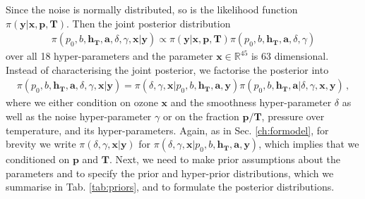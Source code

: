 Since the noise is normally distributed, so is the likelihood function $\pi(\bm{y} | \bm{x}, \bm{p}, \bm{T})$.
Then the joint posterior distribution
\begin{align}
	\pi(p_0,b,\bm{h_T},\bm{a},\delta, \gamma, \bm{x}| \bm{y}) \propto \pi(\bm{y} | \bm{x}, \bm{p}, \bm{T}) \pi(p_0,b,\bm{h_T},\bm{a},\delta, \gamma) 
\end{align}
over all 18 hyper-parameters and the parameter $\bm{x} \in \mathbb{R}^{45}$ is 63 dimensional.
Instead of characterising the joint posterior, we factorise the posterior into
\begin{align}
	\pi(p_0,b,\bm{h_T},\bm{a},\delta, \gamma, \bm{x}| \bm{y}) = \pi(\delta, \gamma, \bm{x}| p_0,b,\bm{h_T},\bm{a},\bm{y}) \pi(p_0,b,\bm{h_T},\bm{a}|\delta, \gamma, \bm{x}, \bm{y}) \, , 
\end{align}
where we either condition on ozone $\bm{x}$ and the smoothness hyper-parameter $\delta$ as well as the noise hyper-parameter $\gamma$ or on the fraction $\bm{p}/\bm{T}$, pressure over temperature, and its hyper-parameters.
Again, as in Sec. \ref{ch:formodel}, for brevity we write $\pi(\delta, \gamma, \bm{x}|\bm{y})$ for $\pi(\delta, \gamma, \bm{x}|p_0,b,\bm{h_T},\bm{a},\bm{y})$, which implies that we conditioned on $\bm{p}$ and $\bm{T}$. 
Next, we need to make prior assumptions about the parameters and to specify the prior and hyper-prior distributions, which we summarise in Tab. \ref{tab:priors}, and to formulate the posterior distributions.
